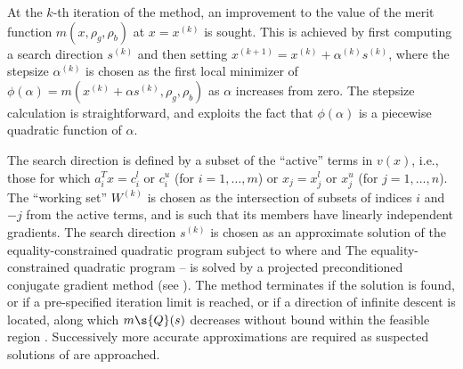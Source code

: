 \documentclass[twoside]{article}
\begin{document}
At the $k$-th iteration of the method, an improvement to the value
of the merit function $m(x, \rho_g, \rho_b )$
at $x = x^{(k)}$ is sought. This is achieved by first
computing a search direction $s^{(k)}$
and then setting $x^{(k+1)} = x^{(k)} + \alpha^{(k)} s^{(k)}$,
where the stepsize $\alpha^{(k)}$ is chosen as the first local minimizer of
$\phi ( \alpha ) = m( x^{(k)} + \alpha s^{(k)} , \rho_g, \rho_b )$
as $\alpha$ increases from zero.
The stepsize calculation is straightforward, and exploits the fact that
$\phi ( \alpha )$ is a piecewise quadratic function of $\alpha$.

The search direction is defined by a subset of the ``active'' terms in
$v(x)$, i.e., those for which
$a_i^T x = c_i^l$ or $c_i^u$ (for $i=1,\ldots ,m$) or
$x_j = x_j^l$ or $x_j^u$ (for $j=1,\ldots ,n$).
The ``working set'' $W^{(k)}$ is chosen as the intersection of
subsets of indices $i$ and $-j$ from the active terms, and is such
that its members have linearly independent gradients.
The search direction $s^{(k)}$ is chosen as an approximate solution of
the equality-constrained quadratic program
subject to
where
and
The equality-constrained quadratic program -- is solved by
a projected preconditioned conjugate gradient
method (see ). The method terminates
if the solution is found, or if a pre-specified iteration limit is reached,
or if a direction of infinite descent is located, along which $m\s{Q}(s)$
decreases without bound within the feasible region .
Successively more accurate approximations are required as suspected
solutions of  are approached.
\end{document}
